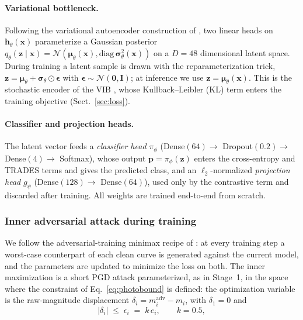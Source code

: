 \documentclass{aa}
\begin{document}
\paragraph{Variational bottleneck.} Following the variational autoencoder construction of \citet{kingma2013auto}, two linear heads on $\mathbf{h}_\theta(\mathbf{x})$ parameterize a Gaussian posterior $q_\theta(\mathbf{z} \mid \mathbf{x}) = \mathcal{N}(\boldsymbol{\mu}_\theta(\mathbf{x}), \mathrm{diag}\,\boldsymbol{\sigma}^2_\theta(\mathbf{x}))$ on a $D = 48$ dimensional latent space. During training a latent sample is drawn with the reparameterization trick, $\mathbf{z} = \boldsymbol{\mu}_\theta + \boldsymbol{\sigma}_\theta \odot \boldsymbol{\epsilon}$ with $\boldsymbol{\epsilon} \sim \mathcal{N}(\mathbf{0}, \mathbf{I})$; at inference we use $\mathbf{z} = \boldsymbol{\mu}_\theta(\mathbf{x})$. This is the stochastic encoder of the VIB \citep{alemi2017deep}, whose Kullback--Leibler (KL) term enters the training objective (Sect.~\ref{sec:loss}).

\paragraph{Classifier and projection heads.} The latent vector feeds a \emph{classifier head} $\pi_\phi$ (Dense$(64) \to$ Dropout$(0.2) \to$ Dense$(4) \to$ Softmax), whose output $\mathbf{p} = \pi_\phi(\mathbf{z})$ enters the cross-entropy and TRADES terms and gives the predicted class, and an $\ell_2$-normalized \emph{projection head} $g_\psi$ (Dense$(128) \to$ Dense$(64)$), used only by the contrastive term and discarded after training. All weights are trained end-to-end from scratch.

\subsubsection{Inner adversarial attack during training} \label{sec:inner_attack}

We follow the adversarial-training minimax recipe of \citet{madry2017towards}: at every training step a worst-case counterpart of each clean curve is generated against the current model, and the parameters are updated to minimize the loss on both. The inner maximization is a short PGD attack parameterized, as in Stage~1, in the space where the constraint of Eq.~\eqref{eq:photobound} is defined: the optimization variable is the raw-magnitude displacement $\delta_i = m^{\mathrm{adv}}_i - m_i$, with $\delta_1 = 0$ and
\begin{equation}
\label{eq:inner_eps}
|\delta_i| \;\le\; \epsilon_i \;=\; k\,e_i, \qquad k = 0.5,
\end{equation}
\end{document}
